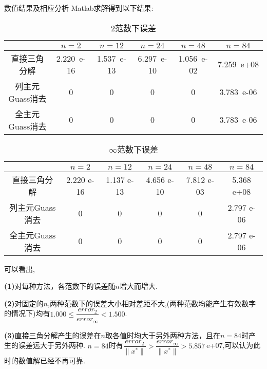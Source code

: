 \documentclass{article}
\begin{document}
\begin{section}{数值结果及相应分析}
    Matlab求解得到以下结果:
    \begin{table}[htbp]
        \centering
        \caption{$2$范数下误差}
        
        \begin{tabular}{cccccc}
        \hline
                   & $n=2$     & $n=12$    & $n=24$    & $n=48$   & $n=84$    \\ \hline
        直接三角分解     & 2.220\ e-16 & 1.537\ e-13 & 6.297\ e-10 & 1.056\ e-02 & 7.259\ e+08  \\
        列主元Guass消去 & 0         & 0         & 0         & 0        & 3.783\ e-06 \\
        全主元Guass消去 & 0         & 0         & 0         & 0        & 3.783\ e-06 \\ \hline
        \end{tabular}
    \end{table}
    \begin{table}[htbp]
        \centering
        \caption{$\infty$范数下误差}

        \begin{tabular}{cccccc}
        \hline
                   & $n=2$     & $n=12$     & $n=24$     & $n=48$    & $n=84$     \\ \hline
        直接三角分解     & 2.220 e-16 & 1.137 e-13 & 4.656 e-10 & 7.812 e-03 & 5.368 e+08  \\
        列主元Guass消去 & 0         & 0          & 0          & 0         & 2.797 e-06 \\
        全主元Guass消去 & 0         & 0          & 0          & 0         & 2.797 e-06 \\ \hline
        \end{tabular}
        \end{table}
        
        可以看出,
        
        \linespread{1.5}\selectfont
        \noindent\textbf{(1)}对每种方法，各范数下的误差随$n$增大而增大.
        
        \noindent\textbf{(2)}对固定的$n$,两种范数下的误差大小相对差距不大,(两种范数均能产生有效数字的情况下)均有$1.000\leq\dfrac{error_2}{error_{\infty}}<1.500$.
        
        \noindent\textbf{(3)}直接三角分解产生的误差在$n$取各值时均大于另外两种方法，且在$n=84$时产生的误差远大于另外两种.
        $n=84$时有$\dfrac{error_2}{\| x^*\|}>\dfrac{error_{\infty}}{\| x^*\|}>5.857\ $e+07,可以认为此时的数值解已经不再可靠.


\end{section}
\end{document}
